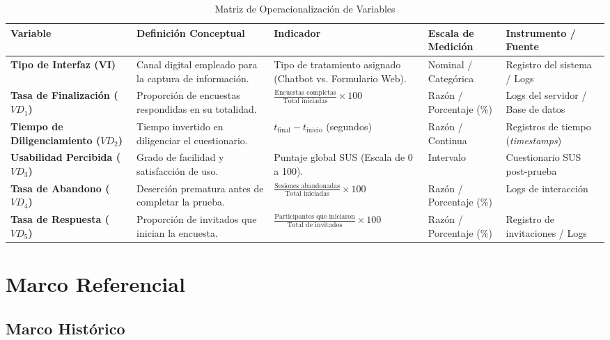 \documentclass[12pt,letterpaper]{article}
\begin{document}
\begin{table}[htbp]
\centering
\caption{Matriz de Operacionalización de Variables}
\label{tab:operacionalizacion}
\small
\begin{tabular}{|p{3cm}|p{3.5cm}|p{3.5cm}|p{2.5cm}|p{2.5cm}|}
\hline
\textbf{Variable} & \textbf{Definición Conceptual} & \textbf{Indicador} & \textbf{Escala de Medición} & \textbf{Instrumento / Fuente} \\ \hline
\textbf{Tipo de Interfaz (VI)} & Canal digital empleado para la captura de información. & Tipo de tratamiento asignado (Chatbot vs. Formulario Web). & Nominal / Categórica & Registro del sistema / Logs \\ \hline
\textbf{Tasa de Finalización ($VD_1$)} & Proporción de encuestas respondidas en su totalidad. & $\frac{\text{Encuestas completas}}{\text{Total iniciadas}} \times 100$ & Razón / Porcentaje (\%) & Logs del servidor / Base de datos \\ \hline
\textbf{Tiempo de Diligenciamiento ($VD_2$)} & Tiempo invertido en diligenciar el cuestionario. & $t_{\text{final}} - t_{\text{inicio}}$ (segundos) & Razón / Continua & Registros de tiempo (\textit{timestamps}) \\ \hline
\textbf{Usabilidad Percibida ($VD_3$)} & Grado de facilidad y satisfacción de uso. & Puntaje global SUS (Escala de 0 a 100). & Intervalo & Cuestionario SUS post-prueba \\ \hline
\textbf{Tasa de Abandono ($VD_4$)} & Deserción prematura antes de completar la prueba. & $\frac{\text{Sesiones abandonadas}}{\text{Total iniciadas}} \times 100$ & Razón / Porcentaje (\%) & Logs de interacción \\ \hline
\textbf{Tasa de Respuesta ($VD_5$)} & Proporción de invitados que inician la encuesta. & $\frac{\text{Participantes que iniciaron}}{\text{Total de invitados}} \times 100$ & Razón / Porcentaje (\%) & Registro de invitaciones / Logs \\ \hline
\end{tabular}
\end{table}

\section{Marco Referencial}

\subsection{Marco Histórico}
\end{document}
